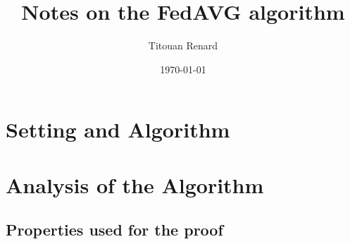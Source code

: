 \documentclass[11pt,hidelinks]{article}
\title{Notes on the FedAVG algorithm}
\date{\today}
\author{Titouan Renard}
\begin{document}
\maketitle	
\tableofcontents

\section{Setting and Algorithm}

\newpage

\section{Analysis of the Algorithm}

\newpage
\subsection{Properties used for the proof}

\newpage
\end{document}
